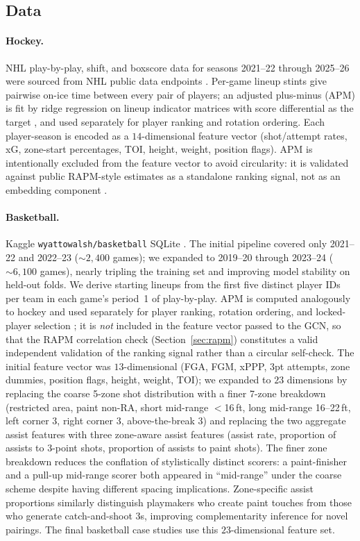 \documentclass[11pt,letterpaper]{article}
\begin{document}
\subsection{Data}

\paragraph{Hockey.} NHL play-by-play, shift, and boxscore data for
seasons 2021--22 through 2025--26 were sourced from NHL public data
endpoints \cite{nhlPublicApi}. Per-game lineup stints give pairwise
on-ice time between every pair of players; an adjusted plus-minus (APM)
is fit by ridge regression on lineup indicator matrices with score
differential as the target \cite{hoerl1970ridge,macdonald2011nhl}, and
used separately for player ranking and rotation ordering. Each
player-season is encoded as a
$14$-dimensional feature vector (shot/attempt rates, xG, zone-start
percentages, TOI, height, weight, position flags). APM is intentionally
excluded from the feature vector to avoid circularity: it is validated
against public RAPM-style estimates as a standalone ranking signal, not
as an embedding component \cite{sill2010rapm,ghimire2020rapm}.

\paragraph{Basketball.} Kaggle \texttt{wyattowalsh/basketball} SQLite
\cite{walshBasketball,walshNbadb}.
The initial pipeline covered only 2021--22 and 2022--23 ($\sim 2{,}400$
games); we expanded to 2019--20 through 2023--24 ($\sim 6{,}100$ games),
nearly tripling the training set and improving model stability on
held-out folds. We derive starting lineups from the first five distinct
player IDs per team in each game's period~1 of play-by-play. APM is
computed analogously to hockey and used separately for player ranking,
rotation ordering, and locked-player selection
\cite{sill2010rapm,ghimire2020rapm}; it is \emph{not} included in the
feature vector passed to the GCN, so that the RAPM correlation check
(Section~\ref{sec:rapm}) constitutes a valid
independent validation of the ranking signal rather than a circular
self-check. The initial feature vector was $13$-dimensional (FGA, FGM,
xPPP, 3pt attempts, zone dummies, position flags, height, weight, TOI);
we expanded to $23$ dimensions by replacing the coarse 5-zone shot
distribution with a finer 7-zone breakdown (restricted area, paint
non-RA, short mid-range $<$16\,ft, long mid-range 16--22\,ft, left
corner 3, right corner 3, above-the-break 3) and replacing the two
aggregate assist features with three zone-aware assist features (assist
rate, proportion of assists to 3-point shots, proportion of assists to
paint shots). The finer zone breakdown reduces the conflation of
stylistically distinct scorers: a paint-finisher and a pull-up
mid-range scorer both appeared in ``mid-range'' under the coarse scheme
despite having different spacing implications. Zone-specific assist
proportions similarly distinguish playmakers who create paint touches
from those who generate catch-and-shoot 3s, improving complementarity
inference for novel pairings.
The final basketball case studies use this $23$-dimensional feature
set.
\end{document}
